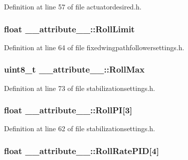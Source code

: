 \-Definition at line 57 of file actuatordesired.\-h.

\hypertarget{struct____attribute_____a411633d0490b74fbdbb6513a02c70218}{
\subsubsection[{\-Roll\-Limit}]{\setlength{\rightskip}{0pt plus 5cm}float {\bf \-\_\-\-\_\-attribute\-\_\-\-\_\-\-::\-Roll\-Limit}}}\label{struct____attribute_____a411633d0490b74fbdbb6513a02c70218}


\-Definition at line 64 of file fixedwingpathfollowersettings.\-h.

\hypertarget{struct____attribute_____a81f61f01a70fcce57a1bc80206c01ac3}{
\subsubsection[{\-Roll\-Max}]{\setlength{\rightskip}{0pt plus 5cm}uint8\-\_\-t {\bf \-\_\-\-\_\-attribute\-\_\-\-\_\-\-::\-Roll\-Max}}}\label{struct____attribute_____a81f61f01a70fcce57a1bc80206c01ac3}


\-Definition at line 73 of file stabilizationsettings.\-h.

\hypertarget{struct____attribute_____a22c27771c62e8eb2c4c6b7f0a91cc139}{
\subsubsection[{\-Roll\-P\-I}]{\setlength{\rightskip}{0pt plus 5cm}float {\bf \-\_\-\-\_\-attribute\-\_\-\-\_\-\-::\-Roll\-P\-I}\mbox{[}3\mbox{]}}}\label{struct____attribute_____a22c27771c62e8eb2c4c6b7f0a91cc139}


\-Definition at line 62 of file stabilizationsettings.\-h.

\hypertarget{struct____attribute_____af72fa6c8a98bb6f53c61bcf940acad9c}{
\subsubsection[{\-Roll\-Rate\-P\-I\-D}]{\setlength{\rightskip}{0pt plus 5cm}float {\bf \-\_\-\-\_\-attribute\-\_\-\-\_\-\-::\-Roll\-Rate\-P\-I\-D}\mbox{[}4\mbox{]}}}\label{struct____attribute_____af72fa6c8a98bb6f53c61bcf940acad9c}


